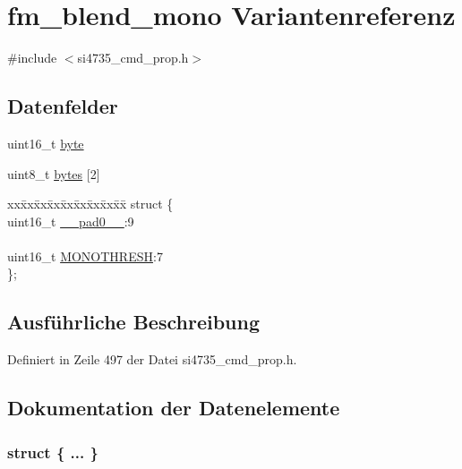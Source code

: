 \hypertarget{unionfm__blend__mono}{}\section{fm\+\_\+blend\+\_\+mono Variantenreferenz}
\label{unionfm__blend__mono}


{\ttfamily \#include $<$si4735\+\_\+cmd\+\_\+prop.\+h$>$}

\subsection*{Datenfelder}
\begin{DoxyCompactItemize}
\item 
uint16\+\_\+t \hyperlink{unionfm__blend__mono_ab0549c1b5ea980a02e7eab77e21fea49}{byte}
\item 
uint8\+\_\+t \hyperlink{unionfm__blend__mono_a46e4c05d20a047ec169f60d3167e912e}{bytes} \mbox{[}2\mbox{]}
\item 
\begin{tabbing}
xx\=xx\=xx\=xx\=xx\=xx\=xx\=xx\=xx\=\kill
struct \{\\
\>uint16\_t \hyperlink{unionfm__blend__mono_a77132c2c26a75f5b8751b235cda23828}{\_\_pad0\_\_}:9\\
\>\\
\>uint16\_t \hyperlink{unionfm__blend__mono_a5de7498b6512934529d0c6284f120805}{MONOTHRESH}:7\\
\}; \\

\end{tabbing}\end{DoxyCompactItemize}


\subsection{Ausführliche Beschreibung}


Definiert in Zeile 497 der Datei si4735\+\_\+cmd\+\_\+prop.\+h.



\subsection{Dokumentation der Datenelemente}
\hypertarget{unionfm__blend__mono_ad78081005367ff8f831f224ea65cf0b9}{}\subsubsection[{"@53}]{\setlength{\rightskip}{0pt plus 5cm}struct \{ ... \} }\label{unionfm__blend__mono_ad78081005367ff8f831f224ea65cf0b9}
\hypertarget{unionfm__blend__mono_a77132c2c26a75f5b8751b235cda23828}{}
